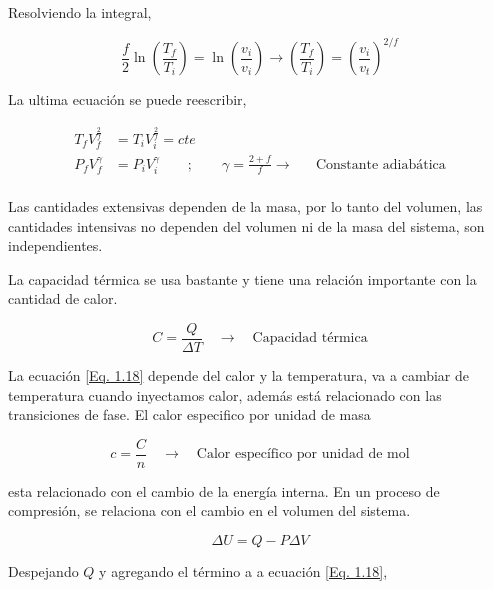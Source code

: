 \documentclass[11pt,fleqn]{book}
\begin{document}
Resolviendo la integral,

\begin{equation}
    \frac{f}{2} \ln \left(\frac{T_{f}}{T_{i}}\right)=\ln \left(\frac{v_{i}}{v_{i}}\right) \rightarrow\left(\frac{T_{f}}{T_{i}}\right)=\left(\frac{v_{i}}{v_{t}}\right)^{2 / f}
    \label{Eq. 1.16}
\end{equation}

La ultima ecuación se puede reescribir,

\begin{equation}
    \begin{split}
        T_{f}V_{f}^{\frac{2}{f}}&=T_{i}V_{i}^{\frac{2}{f}}=cte\\
        P_{f}V_{f}^{\gamma}&=P_{i}V_{i}^{\gamma}\qquad;\qquad\gamma=\frac{2+f}{f}\longrightarrow&&\text{Constante adiabática}\\
    \end{split}
    \label{Eq. 1.17}
\end{equation}

Las cantidades extensivas dependen de la masa, por lo tanto del volumen, las cantidades intensivas no dependen del volumen ni de la masa del sistema, son independientes.

La capacidad térmica se usa bastante y tiene una relación importante con la cantidad de calor.

\begin{equation}
    C=\frac{Q}{\Delta T}\quad\longrightarrow\quad\text{Capacidad térmica}
    \label{Eq. 1.18}
\end{equation}

La ecuación \ref{Eq. 1.18} depende del calor y la temperatura, va a cambiar de temperatura cuando inyectamos calor, además está relacionado con las transiciones de fase. El calor especifico por unidad de masa

\begin{equation}
    c=\frac{C}{n}\quad\longrightarrow\quad\text{Calor específico por unidad de mol}
    \label{Eq. 1.19}
\end{equation}

esta relacionado con el cambio de la energía interna. En un proceso de compresión, se relaciona con el cambio en el volumen del sistema.

\begin{equation*}
    \Delta U=Q-P\Delta V
\end{equation*}

Despejando $Q$ y agregando el término a a ecuación \ref{Eq. 1.18},
\end{document}
